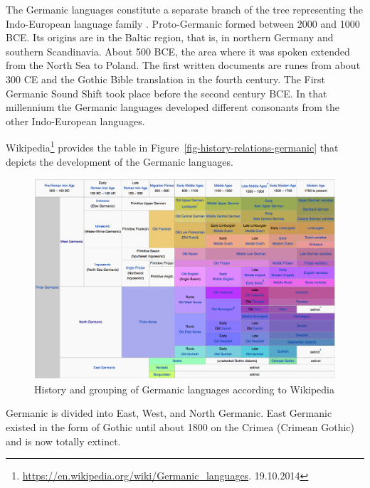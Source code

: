 The Germanic languages constitute a separate branch of the tree representing the Indo-European
language family \citep[]{Fitch2007a-u}.
Proto-Germanic formed between 2000 and
1000 BCE. Its origins are in the Baltic region, that is, in northern Germany and southern
Scandinavia. About 500 BCE, the area where it was spoken extended from the North Sea to Poland.
The first written documents are runes from about 300 CE and the Gothic Bible translation in the fourth century.
The First Germanic Sound Shift took place before the second century BCE. In that millennium the
Germanic languages developed different consonants from the other Indo-European languages. 

Wikipedia\footnote{
\url{https://en.wikipedia.org/wiki/Germanic_languages}. 19.10.2014
} provides the table in Figure~\vref{fig-history-relations-germanic} that depicts the development of
the Germanic languages.
\begin{figure}
\begin{sideways}
\includegraphics[width=.9\textheight]{Pictures/germanic-wikipedia}
\end{sideways}
\caption{\label{fig-history-relations-germanic}History and grouping of Germanic languages according to Wikipedia}
\end{figure}
Germanic is divided into East, West, and North Germanic. East Germanic existed in the form of Gothic
until about 1800 on the Crimea (Crimean Gothic) and is now totally extinct. 


